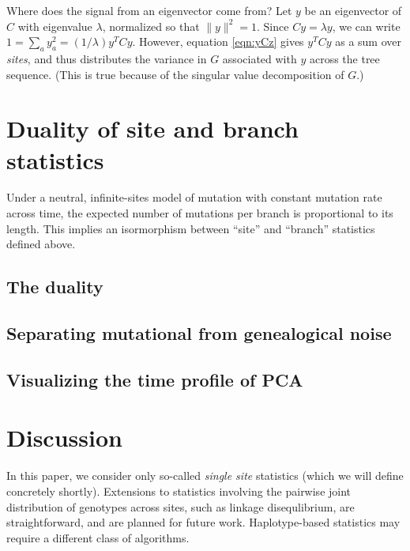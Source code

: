\documentclass{article}
\begin{document}
Where does the signal from an eigenvector come from?
Let $y$ be an eigenvector of $C$ with eigenvalue $\lambda$, normalized so that $\|y\|^2 = 1$.
Since $Cy = \lambda y$,
we can write $1 = \sum_a y_a^2 = (1/\lambda) y^T C y$.
However, equation \eqref{eqn:yCz} gives $y^T C y$ as a sum over \emph{sites},
and thus distributes the variance in $G$ associated with $y$
across the tree sequence.
(This is true because of the singular value decomposition of $G$.)



\section*{Duality of site and branch statistics}

Under a neutral, infinite-sites model of mutation with constant mutation rate across time,
the expected number of mutations per branch is proportional to its length.
This implies an isormorphism between ``site'' and ``branch'' statistics defined above.


\subsection*{The duality}



\subsection*{Separating mutational from genealogical noise}


\subsection*{Visualizing the time profile of PCA}



\section*{Discussion}

In this paper,
we consider only so-called \emph{single site} statistics
(which we will define concretely shortly).
Extensions to statistics involving the pairwise joint distribution of genotypes across sites,
such as linkage disequlibrium,
are straightforward, and are planned for future work.
Haplotype-based statistics may require a different class of algorithms.
\end{document}
